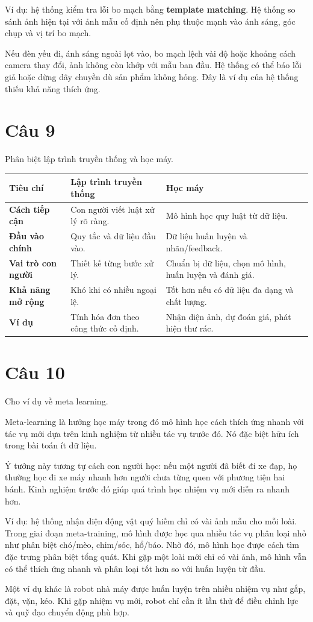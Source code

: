 Ví dụ: hệ thống kiểm tra lỗi bo mạch bằng \textbf{template matching}. Hệ thống so sánh ảnh hiện tại với ảnh mẫu cố định nên phụ thuộc mạnh vào ánh sáng, góc chụp và vị trí bo mạch.

Nếu đèn yếu đi, ánh sáng ngoài lọt vào, bo mạch lệch vài độ hoặc khoảng cách camera thay đổi, ảnh không còn khớp với mẫu ban đầu. Hệ thống có thể báo lỗi giả hoặc dừng dây chuyền dù sản phẩm không hỏng. Đây là ví dụ của hệ thống thiếu khả năng thích ứng.

\section*{Câu 9}
Phân biệt lập trình truyền thống và học máy.

\small
\begin{longtable}{|p{}|p{}|p{}|}
\hline
\textbf{Tiêu chí} & \textbf{Lập trình truyền thống} & \textbf{Học máy} \\
\hline
\textbf{Cách tiếp cận} & Con người viết luật xử lý rõ ràng. & Mô hình học quy luật từ dữ liệu. \\
\hline
\textbf{Đầu vào chính} & Quy tắc và dữ liệu đầu vào. & Dữ liệu huấn luyện và nhãn/feedback. \\
\hline
\textbf{Vai trò con người} & Thiết kế từng bước xử lý. & Chuẩn bị dữ liệu, chọn mô hình, huấn luyện và đánh giá. \\
\hline
\textbf{Khả năng mở rộng} & Khó khi có nhiều ngoại lệ. & Tốt hơn nếu có dữ liệu đa dạng và chất lượng. \\
\hline
\textbf{Ví dụ} & Tính hóa đơn theo công thức cố định. & Nhận diện ảnh, dự đoán giá, phát hiện thư rác. \\
\hline
\end{longtable}
\normalsize

\section*{Câu 10}
Cho ví dụ về meta learning.

Meta-learning là hướng học máy trong đó mô hình học cách thích ứng nhanh với tác vụ mới dựa trên kinh nghiệm từ nhiều tác vụ trước đó. Nó đặc biệt hữu ích trong bài toán ít dữ liệu.

Ý tưởng này tương tự cách con người học: nếu một người đã biết đi xe đạp, họ thường học đi xe máy nhanh hơn người chưa từng quen với phương tiện hai bánh. Kinh nghiệm trước đó giúp quá trình học nhiệm vụ mới diễn ra nhanh hơn.

Ví dụ: hệ thống nhận diện động vật quý hiếm chỉ có vài ảnh mẫu cho mỗi loài. Trong giai đoạn meta-training, mô hình được học qua nhiều tác vụ phân loại nhỏ như phân biệt chó/mèo, chim/sóc, hổ/báo. Nhờ đó, mô hình học được cách tìm đặc trưng phân biệt tổng quát. Khi gặp một loài mới chỉ có vài ảnh, mô hình vẫn có thể thích ứng nhanh và phân loại tốt hơn so với huấn luyện từ đầu.

Một ví dụ khác là robot nhà máy được huấn luyện trên nhiều nhiệm vụ như gắp, đặt, vặn, kéo. Khi gặp nhiệm vụ mới, robot chỉ cần ít lần thử để điều chỉnh lực và quỹ đạo chuyển động phù hợp.
